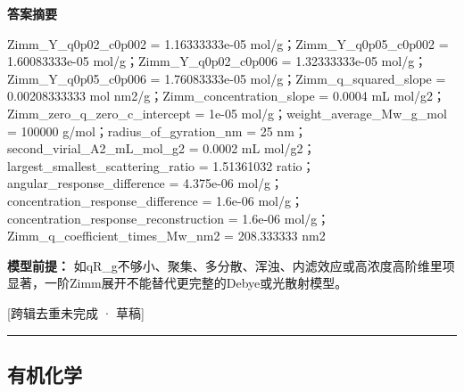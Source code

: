 \documentclass[UTF8,11pt,a4paper]{ctexart}
\begin{document}
\noindent\textbf{答案摘要}\par
Zimm\_Y\_q0p02\_c0p002 = 1.16333333e-05 mol/g；Zimm\_Y\_q0p05\_c0p002 = 1.60083333e-05 mol/g；Zimm\_Y\_q0p02\_c0p006 = 1.32333333e-05 mol/g；Zimm\_Y\_q0p05\_c0p006 = 1.76083333e-05 mol/g；Zimm\_q\_squared\_slope = 0.00208333333 mol nm2/g；Zimm\_concentration\_slope = 0.0004 mL mol/g2；Zimm\_zero\_q\_zero\_c\_intercept = 1e-05 mol/g；weight\_average\_Mw\_g\_mol = 100000 g/mol；radius\_of\_gyration\_nm = 25 nm；second\_virial\_A2\_mL\_mol\_g2 = 0.0002 mL mol/g2；largest\_smallest\_scattering\_ratio = 1.51361032 ratio；angular\_response\_difference = 4.375e-06 mol/g；concentration\_response\_difference = 1.6e-06 mol/g；concentration\_response\_reconstruction = 1.6e-06 mol/g；Zimm\_q\_coefficient\_times\_Mw\_nm2 = 208.333333 nm2\par
\noindent\textbf{模型前提：}
如qR\_g不够小、聚集、多分散、浑浊、内滤效应或高浓度高阶维里项显著，一阶Zimm展开不能替代更完整的Debye或光散射模型。\par
\noindent\textcolor{red!65!black}{[跨辑去重未完成 · 草稿]} \par
\medskip\hrule\medskip
\subsection*{有机化学}
\end{document}
